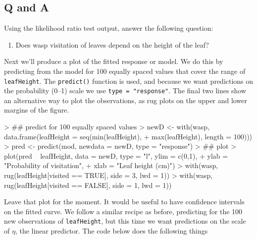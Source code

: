 \documentclass[a4paper,10pt]{article}
\begin{document}
\subsection*{Q and A}
Using the likelihood ratio test output, answer the following question:

\begin{enumerate}
\item Does wasp visitation of leaves depend on the height of the leaf?
\end{enumerate}

Next we'll produce a plot of the fitted response or model. We do this by predicting from the model for 100 equally spaced values that cover the range of \texttt{leafHeight}. The \texttt{predict()} function is used, and because we want predictions on the probability (0--1) scale we use \texttt{type = "response"}. The final two lines show an alternative way to plot the observations, as rug plots on the upper and lower margins of the figure.

\begin{Schunk}
\begin{Sinput}
> ## predict for 100 equally spaced values
> newD <- with(wasp, data.frame(leafHeight = seq(min(leafHeight),
+                                 max(leafHeight), length = 100)))
> pred <- predict(mod, newdata = newD, type = "response")
> ## plot
> plot(pred ~ leafHeight, data = newD, type = "l", ylim = c(0,1),
+      ylab = "Probability of visitation",
+      xlab = "Leaf height (cm)")
> with(wasp, rug(leafHeight[visited == TRUE], side = 3, lwd = 1))
> with(wasp, rug(leafHeight[visited == FALSE], side = 1, lwd = 1))
\end{Sinput}
\end{Schunk}

Leave that plot for the moment. It would be useful to have confidence intervals on the fitted curve. We follow a similar recipe as before, predicting for the 100 new observations of \texttt{leafHeight}, but this time we want predictions on the scale of $\eta$, the linear predictor. The code below does the following things
\end{document}
